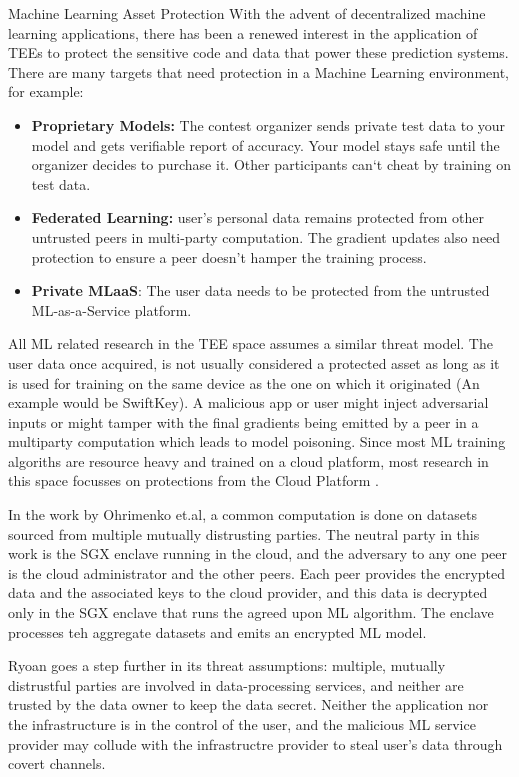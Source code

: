 \begin{subsection}{Machine Learning Asset Protection}
With the advent of decentralized machine learning applications, there has been a
renewed interest in the application of TEEs to protect the sensitive code and
data that power these prediction systems. There are many targets that need
protection in a Machine Learning environment, for example:
\begin{itemize}
    \item \textbf{Proprietary Models:} The contest organizer sends private test
    data to your model and gets verifiable report of accuracy. Your model stays
    safe until the organizer decides to purchase it. Other participants can‘t
    cheat by training on test data.
    \item \textbf{Federated Learning:} user's personal data remains protected
    from other untrusted peers in multi-party computation. The gradient updates
    also need protection to ensure a peer doesn't hamper the training process.
    \item \textbf{Private MLaaS}: The user data needs to be protected from the
    untrusted ML-as-a-Service platform.
\end{itemize}

All ML related research in the TEE space assumes a similar threat model. The
user data once acquired, is not usually considered a protected asset as long as
it is used for training on the same device as the one on which it originated (An
example would be SwiftKey\cite{swiftkey_support}). A malicious app or user might
inject adversarial inputs or might tamper with the final gradients being emitted
by a peer in a multiparty computation which leads to model poisoning. Since most
ML training algoriths are resource heavy and trained on a cloud platform, most
research in this space focusses on protections from the Cloud Platform
\cite{ohrimenko2016oblivious,ryoan}. 

In the work by Ohrimenko et.al\cite{ohrimenko2016oblivious}, a common
computation is done on datasets sourced from multiple mutually distrusting
parties. The neutral party in this work is the SGX enclave running in the cloud,
and the adversary to any one peer is the cloud administrator and the other
peers. Each peer provides the encrypted data and the associated keys to the
cloud  provider, and this data is decrypted only in the SGX enclave that runs
the agreed upon ML algorithm. The enclave processes teh aggregate datasets and
emits an encrypted ML model. 

Ryoan\cite{ryoan} goes a step further in its threat assumptions: multiple,
mutually distrustful parties are involved in data-processing services, and
neither are trusted by the data owner to keep the data secret. Neither the
application nor the infrastructure is in the control of the user, and the
malicious ML service provider may collude with the infrastructre provider to
steal user's data through covert channels.


\end{subsection}
    
